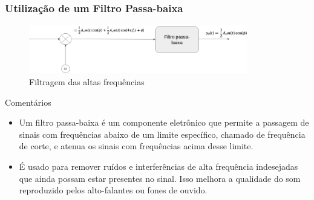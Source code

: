 \documentclass[10pt,hyperref={pdfpagemode=FullScreen},aspectratio=169]{beamer}
\begin{document}
\begin{frame}
  \frametitle{Utilização de um Filtro Passa-baixa}

  \begin{figure}[!t]
    \includegraphics[width = 0.85\textwidth ]{Fig/rx_dsb.png}
    \caption{Filtragem das altas frequências}
  \end{figure}

  \begin{block}{Comentários}
    \begin{itemize}
     \item Um filtro passa-baixa é um componente eletrônico que permite a passagem de sinais com frequências abaixo de um limite específico, chamado de frequência de corte, e atenua os sinais com frequências acima desse limite. 
     \item É usado para remover ruídos e interferências de alta frequência indesejadas que ainda possam estar presentes no sinal. Isso melhora a qualidade do som reproduzido pelos alto-falantes ou fones de ouvido.
    \end{itemize}
  
  \end{block}


\end{frame}
\end{document}
